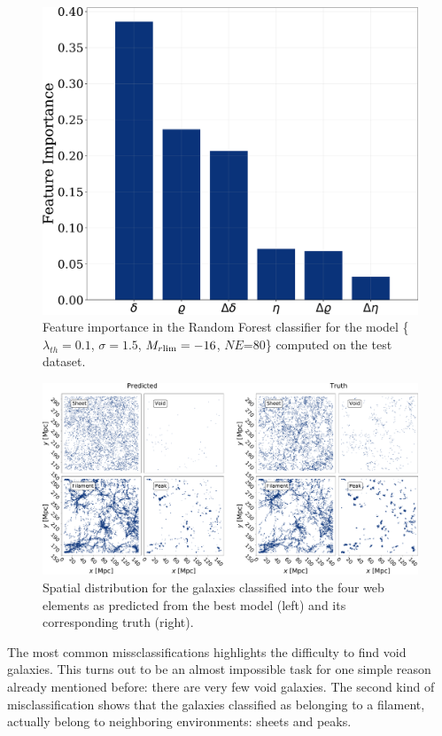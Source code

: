 \documentclass[usenatbib]{mnras}
\begin{document}
\begin{figure}
    \includegraphics[scale=0.29]{Figs/p_features_importance_test.pdf}
    \caption{
      Feature importance in the Random Forest classifier for the model
      \{$\lambda_{th}=0.1$, $\sigma=1.5$, $M_{r\rm lim}=-16$,
      $NE$=80\} computed on the test dataset.}
    \label{fig:feature_importance}
\end{figure}

\begin{figure}
  \centering 
    \includegraphics[scale=0.28]{Figs/p_environment_predicted.pdf}
    \caption{Spatial distribution for the galaxies classified into the
      four web elements as predicted from the best model (left) and its corresponding truth (right).}
    \label{fig:prediction}
\end{figure}

The most common missclassifications highlights the difficulty to find void galaxies.
This turns out to be an almost impossible task for one simple reason already mentioned before:
there are very few void galaxies.
The second kind of misclassification shows that the galaxies classified as belonging to a filament, actually belong to neighboring
environments: sheets and peaks.
\end{document}
